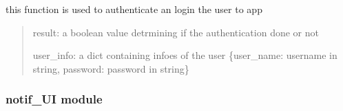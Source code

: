 \documentclass[letterpaper,10pt,english]{sphinxmanual}
\begin{document}
\begin{savenotes}
\begin{fulllineitems}

\begin{savenotes}\begin{fulllineitems}
\label{\detokenize{setting/login_api:oxin.login_api.API.login}}
\pysigstartsignatures
{}
\pysigstopsignatures
\sphinxAtStartPar
this function is used to authenticate an login the user to app
\begin{quote}\begin{description}
\sphinxAtStartPar
result: a boolean value detrmining if the authentication done or not

\sphinxAtStartPar
user\_info: a dict containing infoes of the user
\{user\_name: username in string, password: password in string\}

\end{description}\end{quote}

\end{fulllineitems}\end{savenotes}


\end{fulllineitems}\end{savenotes}


\sphinxstepscope


\subsubsection{notif\_UI module}
\label{\detokenize{setting/notif_UI:module-oxin.notif_UI}}\label{\detokenize{setting/notif_UI:notif-ui-module}}\label{\detokenize{setting/notif_UI::doc}}
\end{document}
